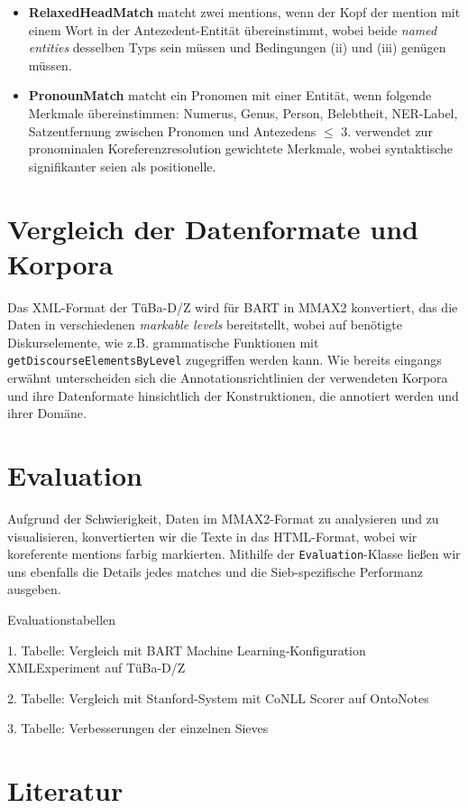 \documentclass{scrartcl}
\begin{document}
\begin{itemize}
\item \textbf{RelaxedHeadMatch} matcht zwei mentions, wenn der Kopf der mention mit einem Wort in der Antezedent-Entität übereinstimmt, wobei beide \textit{named entities} desselben Typs sein müssen und Bedingungen (ii) und (iii) genügen müssen.

\item \textbf{PronounMatch} matcht ein Pronomen mit einer Entität, wenn folgende Merkmale übereinstimmen: Numerus, Genus, Person, Belebtheit, NER-Label, Satzentfernung zwischen Pronomen und Antezedens ${\leq}$ 3.  verwendet zur pronominalen Koreferenzresolution gewichtete Merkmale, wobei syntaktische signifikanter seien als positionelle.

\end{itemize}

\section{Vergleich der Datenformate und Korpora}
Das XML-Format der TüBa-D/Z wird für BART in MMAX2 \cite{muller2006} konvertiert, das die Daten in verschiedenen \textit{markable levels} bereitstellt, wobei auf benötigte Diskurselemente, wie z.B. grammatische Funktionen mit \texttt{getDiscourseElementsByLevel} zugegriffen werden kann. Wie bereits eingangs erwähnt unterscheiden sich die Annotationsrichtlinien der verwendeten Korpora und ihre Datenformate hinsichtlich der Konstruktionen, die annotiert werden und ihrer Domäne.

\section{Evaluation}
Aufgrund der Schwierigkeit, Daten im MMAX2-Format zu analysieren und zu visualisieren, konvertierten wir die Texte in das HTML-Format, wobei wir koreferente mentions farbig markierten. Mithilfe der \texttt{Evaluation}-Klasse ließen wir uns ebenfalls die Details jedes matches und die Sieb-spezifische Performanz ausgeben.

Evaluationstabellen

1. Tabelle: Vergleich mit BART Machine Learning-Konfiguration XMLExperiment auf TüBa-D/Z

2. Tabelle: Vergleich mit Stanford-System mit CoNLL Scorer auf OntoNotes

3. Tabelle: Verbesserungen der einzelnen Sieves

\clearpage

\nocite{*}
\renewcommand*{\refname}{} %
\section{Literatur}  
{}

\end{document}
